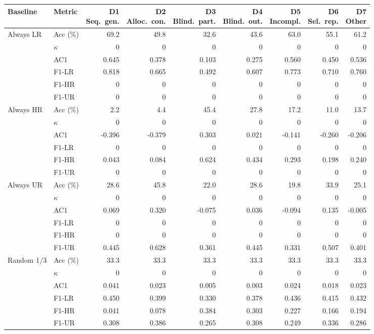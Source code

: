 \begin{tabular}{llrrrrrrr}
\toprule
Baseline & Metric & \makecell{D1\\Seq.\ gen.} & \makecell{D2\\Alloc.\ con.} & \makecell{D3\\Blind.\ part.} & \makecell{D4\\Blind.\ out.} & \makecell{D5\\Incompl.} & \makecell{D6\\Sel.\ rep.} & \makecell{D7\\Other} \\
\midrule
\multirow{6}{*}{Always LR} & Acc (\%) & 69.2 & 49.8 & 32.6 & 43.6 & 63.0 & 55.1 & 61.2 \\
 & $\kappa$ & 0 & 0 & 0 & 0 & 0 & 0 & 0 \\
 & AC1 & 0.645 & 0.378 & 0.103 & 0.275 & 0.560 & 0.450 & 0.536 \\
 & F1-LR & 0.818 & 0.665 & 0.492 & 0.607 & 0.773 & 0.710 & 0.760 \\
 & F1-HR & 0 & 0 & 0 & 0 & 0 & 0 & 0 \\
 & F1-UR & 0 & 0 & 0 & 0 & 0 & 0 & 0 \\
\midrule
\multirow{6}{*}{Always HR} & Acc (\%) & 2.2 & 4.4 & 45.4 & 27.8 & 17.2 & 11.0 & 13.7 \\
 & $\kappa$ & 0 & 0 & 0 & 0 & 0 & 0 & 0 \\
 & AC1 & -0.396 & -0.379 & 0.303 & 0.021 & -0.141 & -0.260 & -0.206 \\
 & F1-LR & 0 & 0 & 0 & 0 & 0 & 0 & 0 \\
 & F1-HR & 0.043 & 0.084 & 0.624 & 0.434 & 0.293 & 0.198 & 0.240 \\
 & F1-UR & 0 & 0 & 0 & 0 & 0 & 0 & 0 \\
\midrule
\multirow{6}{*}{Always UR} & Acc (\%) & 28.6 & 45.8 & 22.0 & 28.6 & 19.8 & 33.9 & 25.1 \\
 & $\kappa$ & 0 & 0 & 0 & 0 & 0 & 0 & 0 \\
 & AC1 & 0.069 & 0.320 & -0.075 & 0.036 & -0.094 & 0.135 & -0.005 \\
 & F1-LR & 0 & 0 & 0 & 0 & 0 & 0 & 0 \\
 & F1-HR & 0 & 0 & 0 & 0 & 0 & 0 & 0 \\
 & F1-UR & 0.445 & 0.628 & 0.361 & 0.445 & 0.331 & 0.507 & 0.401 \\
\midrule
\multirow{6}{*}{Random 1/3} & Acc (\%) & 33.3 & 33.3 & 33.3 & 33.3 & 33.3 & 33.3 & 33.3 \\
 & $\kappa$ & 0 & 0 & 0 & 0 & 0 & 0 & 0 \\
 & AC1 & 0.041 & 0.023 & 0.005 & 0.003 & 0.024 & 0.018 & 0.023 \\
 & F1-LR & 0.450 & 0.399 & 0.330 & 0.378 & 0.436 & 0.415 & 0.432 \\
 & F1-HR & 0.041 & 0.078 & 0.384 & 0.303 & 0.227 & 0.166 & 0.194 \\
 & F1-UR & 0.308 & 0.386 & 0.265 & 0.308 & 0.249 & 0.336 & 0.286 \\
\bottomrule
\end{tabular}